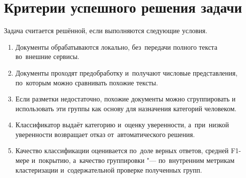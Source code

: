 \section{Критерии успешного решения задачи}\label{sec:ch1/success}\label{subsec:ch1/dev/success}

Задача считается решённой, если выполняются следующие условия.

\begin{enumerate}
    \item Документы обрабатываются локально, без~передачи полного текста
        во~внешние сервисы.
    \item Документы проходят предобработку и~получают числовые представления,
        по~которым можно сравнивать похожие тексты.
    \item Если разметки недостаточно, похожие документы можно сгруппировать и
        использовать эти группы как основу для назначения категорий человеком.
    \item Классификатор выдаёт категорию и~оценку уверенности, а~при~низкой
        уверенности возвращает отказ от~автоматического решения.
    \item Качество классификации оценивается по~доле верных ответов, средней
        F1-мере и~покрытию,
        а~качество группировки "--- по~внутренним метрикам кластеризации
        и~содержательной проверке полученных групп.
\end{enumerate}

\FloatBarrier

